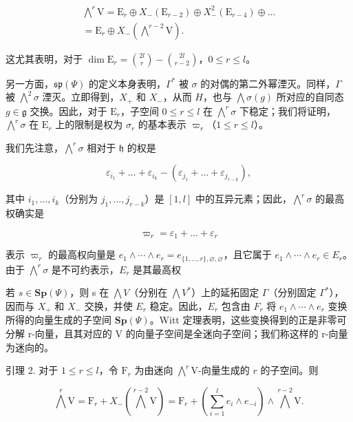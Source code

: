 \[
\begin{array}{c} \bigwedge^ {r} \mathrm{V} = \mathrm{E} _ {r} \oplus X _ {-} (\mathrm{E} _ {r - 2}) \oplus X _ {-} ^ {2} (\mathrm{E} _ {r - 4}) \oplus \dots \\ = \mathrm{E} _ {r} \oplus X _ {-} (\bigwedge^ {r - 2} \mathrm{V}). \end{array}
\]

这尤其表明，对于 \(\dim \mathrm{E}_r = \binom{2l}{r} - \binom{2l}{r-2}\)，\(0 \leq r \leq l\)。

另一方面，\(\mathfrak{sp}(\varPsi)\) 的定义本身表明，\(\Gamma^{*}\) 被 \(\sigma\) 的对偶的第二外幂湮灭。同样，\(\Gamma\) 被 \(\bigwedge^{2}\sigma\) 湮灭。立即得到，\(X_{+}\) 和 \(X_{-}\)，从而 \(H\)，也与 \(\bigwedge\sigma(g)\) 所对应的自同态 \(g\in\mathfrak{g}\) 交换。因此，对于 \(\mathrm{E}_{r}\)，子空间 \(0\leq r\leq l\) 在 \(\bigwedge^{r}\sigma\) 下稳定；我们将证明，\(\bigwedge^{r}\sigma\) 在 \(\mathrm{E}_{r}\) 上的限制是权为 \(\sigma_{r}\) 的基本表示 \(\varpi_{r}\)（\(1\leq r\leq l\)）。

我们先注意，\(\bigwedge^{r}\sigma\) 相对于 \(\mathfrak{h}\) 的权是

\[
\varepsilon_ {i _ {1}} + \dots + \varepsilon_ {i _ {k}} - (\varepsilon_ {j _ {1}} + \dots + \varepsilon_ {j _ {r - k}}),
\]

其中 \(i_1, \ldots, i_k\)（分别为 \(j_1, \ldots, j_{r-k}\)）是 \([1, l]\) 中的互异元素；因此，\(\bigwedge^r \sigma\) 的最高权确实是

\[
\varpi_ {r} = \varepsilon_ {1} + \dots + \varepsilon_ {r}
\]

表示 \(\varpi_{r}\) 的最高权向量是 \(e_{1} \wedge \cdots \wedge e_{r} = e_{\{1,\ldots,r\},\varnothing,\varnothing}\)，且它属于 \(e_{1} \wedge \cdots \wedge e_{r} \in E_{r}\)。由于 \(\bigwedge^{r}\sigma\) 是不可约表示，\(E_{r}\) 是其最高权

若 \(s \in \mathbf{Sp}(\varPsi)\)，则 s 在 \(\bigwedge V\)（分别在 \(\bigwedge V^{*}\)）上的延拓固定 \(\varGamma\)（分别固定 \(\varGamma^{*}\)），因而与 \(X_{+}\) 和 \(X_{-}\) 交换，并使 \(E_{r}\) 稳定。因此，\(E_{r}\) 包含由 \(F_{r}\) 将 \(e_{1} \wedge \cdots \wedge e_{r}\) 变换所得的向量生成的子空间 \(\mathbf{Sp}(\varPsi)\)。Witt 定理表明，这些变换得到的正是非零可分解 r-向量，且其对应的 V 的向量子空间是全迷向子空间；我们称这样的 r-向量为迷向的。

引理 2. 对于 \(1 \leq r \leq l\)，令 \(\mathrm{F}_r\) 为由迷向 \(\bigwedge^r\mathrm{V}\)-向量生成的 \(r\) 的子空间。则

\[
\bigwedge^ {r} \mathrm{V} = \mathrm{F} _ {r} + X _ {-} (\bigwedge^ {r - 2} \mathrm{V}) = \mathrm{F} _ {r} + \left(\sum_ {i = 1} ^ {l} e _ {i} \wedge e _ {- i}\right) \wedge \bigwedge^ {r - 2} \mathrm{V}.
\]

